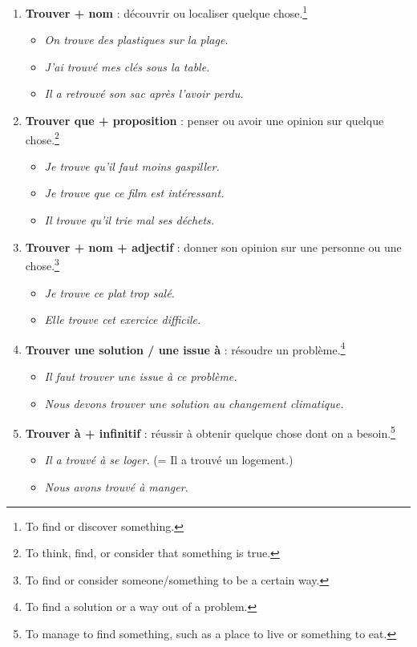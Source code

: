 \documentclass[math,code]{amznotes}
\theoremstyle{remark}
\begin{document}
\begin{enumerate}
    \item \textbf{Trouver + nom} : découvrir ou localiser quelque chose.\footnote{To find or discover something.}
    \begin{itemize}
        \item \textit{On trouve des plastiques sur la plage.}
        \item \textit{J'ai trouvé mes clés sous la table.}
        \item \textit{Il a retrouvé son sac après l'avoir perdu.}
    \end{itemize}

    \item \textbf{Trouver que + proposition} : penser ou avoir une opinion sur quelque chose.\footnote{To think, find, or consider that something is true.}
    \begin{itemize}
        \item \textit{Je trouve qu'il faut moins gaspiller.}
        \item \textit{Je trouve que ce film est intéressant.}
        \item \textit{Il trouve qu'il trie mal ses déchets.}
    \end{itemize}

    \item \textbf{Trouver + nom + adjectif} : donner son opinion sur une personne ou une chose.\footnote{To find or consider someone/something to be a certain way.}
    \begin{itemize}
        \item \textit{Je trouve ce plat trop salé.}
        \item \textit{Elle trouve cet exercice difficile.}
    \end{itemize}

    \item \textbf{Trouver une solution / une issue à} : résoudre un problème.\footnote{To find a solution or a way out of a problem.}
    \begin{itemize}
        \item \textit{Il faut trouver une issue à ce problème.}
        \item \textit{Nous devons trouver une solution au changement climatique.}
    \end{itemize}

    \item \textbf{Trouver à + infinitif} : réussir à obtenir quelque chose dont on a besoin.\footnote{To manage to find something, such as a place to live or something to eat.}
    \begin{itemize}
        \item \textit{Il a trouvé à se loger.} (= Il a trouvé un logement.)
        \item \textit{Nous avons trouvé à manger.}
    \end{itemize}


\end{enumerate}
\end{document}
